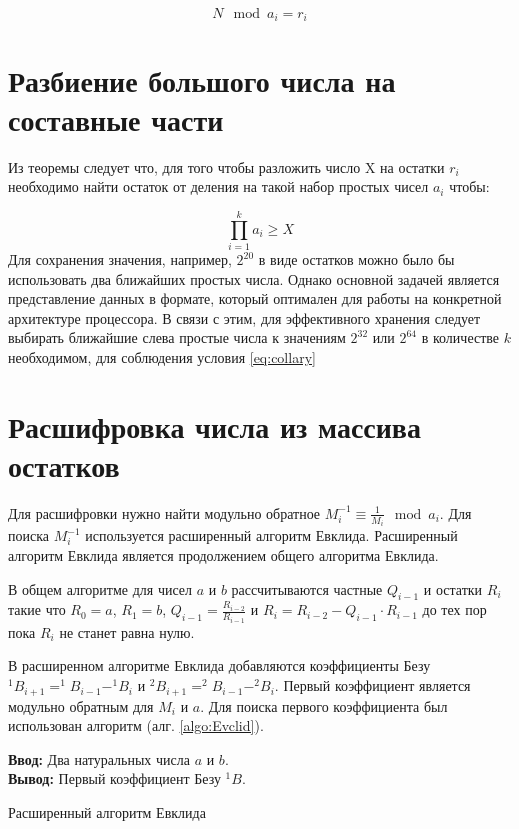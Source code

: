 \documentclass[10pt]{article}
\begin{document}
\begin{equation}
	N \mod a_i = r_i
	\label{eq:rem_th}
\end{equation}

\section{Разбиение большого числа на составные части}

Из теоремы следует что, для того чтобы разложить число X на остатки $r_i$ необходимо найти остаток от деления на такой набор простых чисел $a_i$ чтобы:

\begin{equation}
	\prod\limits_{i=1}^k a_i \geqslant X
	\label{eq:collary}
\end{equation}
Для сохранения значения, например, $2^{20}$ в виде остатков можно было бы использовать два ближайших простых числа. Однако основной задачей является представление данных в формате, который оптимален для работы на конкретной архитектуре процессора. В связи с этим, для эффективного хранения следует выбирать ближайшие слева простые числа к значениям $2^{32}$ или $2^{64}$ в количестве $k$ необходимом, для соблюдения условия \ref{eq:collary} 

\section{Расшифровка числа из массива остатков}

Для расшифровки нужно найти модульно обратное $M_i^{-1}\equiv\frac{1}{M_i}\mod a_i$. Для поиска $M_i^{-1}$ используется расширенный алгоритм Евклида.
Расширенный алгоритм Евклида \cite{Okulov2011} является продолжением общего алгоритма Евклида. 

В общем алгоритме для чисел $a$ и $b$ рассчитываются частные $Q_{i-1}$ и остатки $R_i$ такие что $R_0 = a$, $R_1 = b$, $Q_{i-1} = \frac{R_{i-2}}{R_{i-1}}$ и $R_i = R_{i-2} - Q_{i-1} \cdot R_{i-1}$ до тех пор пока $R_i$ не станет равна нулю.

В расширенном алгоритме Евклида добавляются коэффициенты Безу $^1B_{i+1} = ^1B_{i-1} - ^1B_{i}$ и $^2B_{i+1} = ^2B_{i-1} - ^2B_{i}$. Первый коэффициент является модульно обратным для $M_i$ и $a$. Для поиска первого коэффициента был использован алгоритм (алг. \ref{algo:Evclid}).


\begin{algorithm}[H]
	\textbf{Ввод:} Два натуральных числа $a$ и $b$.\\
	\textbf{Вывод:} Первый коэффициент Безу $^1B$.
	\begin{algorithmic}
		\ENDWHILE {}
	\end{algorithmic}
	\caption{Расширенный алгоритм Евклида}
	\label{algo:Evclid}
\end{algorithm}
\end{document}
